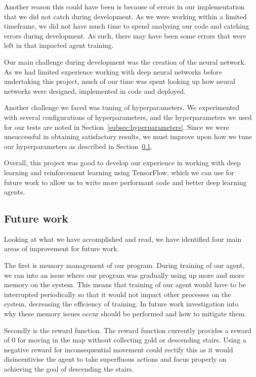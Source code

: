 \documentclass[12pt,a4paper]{article}
\begin{document}
    Another reason this could have been is because of errors in our implementation that we did not catch during development.
    As we were working within a limited timeframe, we did not have much time to spend analysing our code and catching
    errors during development.
    As such, there may have been some errors that were left in that impacted agent training.

    Our main challenge during development was the creation of the neural network.
    As we had limited experience working with deep neural networks before undertaking this project, much of our time was spent
    looking up how neural networks were designed, implemented in code and deployed.

    Another challenge we faced was tuning of hyperparameters.
    We experimented with several configurations of hyperparameters, and the hyperparameters we used for our tests are noted in Section~\ref{subsec:hyperparameters}.
    Since we were unsuccessful in obtaining satisfactory results, we must improve upon how we tune our hyperparameters as described in Section~\ref{subsec:future-work}.

    Overall, this project was good to develop our experience in working with deep learning and reinforcement learning
    using TensorFlow, which we can use for future work to allow us to write more performant code and better deep learning agents.

    \subsection{Future work}\label{subsec:future-work}
    Looking at what we have accomplished and read, we have identified four main areas of improvement for future work.

    The first is memory management of our program.
    During training of our agent, we ran into an issue where our program was gradually using up more and more memory on the system.
    This means that training of our agent would have to be interrupted periodically so that it would not impact other processes on the system, decreasing the efficiency of training.
    In future work investigation into why these memory issues occur should be performed and how to mitigate them.

    Secondly is the reward function.
    The reward function currently provides a reward of 0 for moving in the map without collecting gold or descending stairs.
    Using a negative reward for inconsequential movement could rectify this as it would disincentivise the agent to take
    superfluous actions and focus properly on achieving the goal of descending the stairs.
\end{document}
